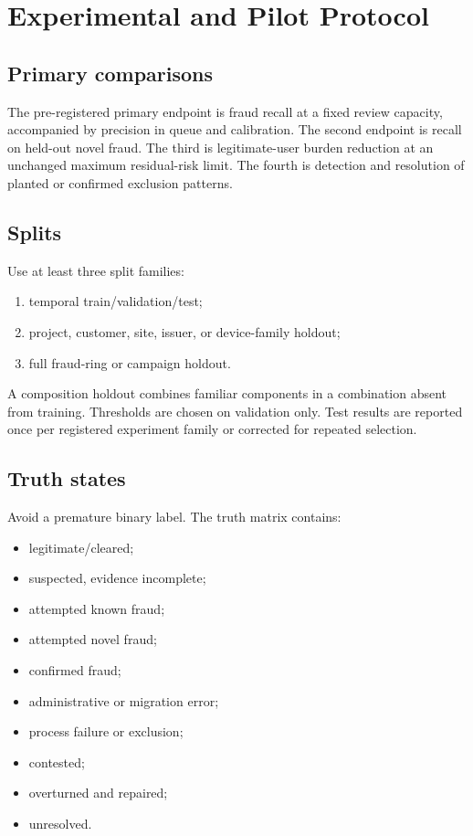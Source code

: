 \chapter{Experimental and Pilot Protocol}

\section{Primary comparisons}

The pre-registered primary endpoint is fraud recall at a fixed review capacity, accompanied by precision in queue and calibration. The second endpoint is recall on held-out novel fraud. The third is legitimate-user burden reduction at an unchanged maximum residual-risk limit. The fourth is detection and resolution of planted or confirmed exclusion patterns.

\section{Splits}

Use at least three split families:

\begin{enumerate}
\item temporal train/validation/test;
\item project, customer, site, issuer, or device-family holdout;
\item full fraud-ring or campaign holdout.
\end{enumerate}

A composition holdout combines familiar components in a combination absent from training. Thresholds are chosen on validation only. Test results are reported once per registered experiment family or corrected for repeated selection.

\section{Truth states}

Avoid a premature binary label. The truth matrix contains:

\begin{itemize}
\item legitimate/cleared;
\item suspected, evidence incomplete;
\item attempted known fraud;
\item attempted novel fraud;
\item confirmed fraud;
\item administrative or migration error;
\item process failure or exclusion;
\item contested;
\item overturned and repaired;
\item unresolved.
\end{itemize}

